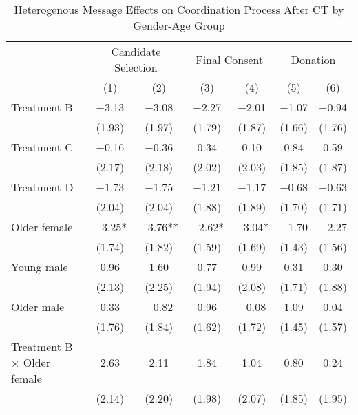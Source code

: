 \documentclass[12pt, a4paper]{article}
\begin{document}
\begin{table}[H]

\caption{\label{tab:lm-interaction-gender-age-coordinate}Heterogenous Message Effects on Coordination Process After CT by Gender-Age Group}
\centering
\fontsize{8}{10}\selectfont
\begin{threeparttable}
\begin{tabular}[t]{lcccccc}
\toprule
\multicolumn{1}{c}{ } & \multicolumn{2}{c}{Candidate Selection} & \multicolumn{2}{c}{Final Consent} & \multicolumn{2}{c}{Donation} \\
\cmidrule(l{3pt}r{3pt}){2-3} \cmidrule(l{3pt}r{3pt}){4-5} \cmidrule(l{3pt}r{3pt}){6-7}
  & (1) & (2) & (3) & (4) & (5) & (6)\\
\midrule
Treatment B & \num{-3.13} & \num{-3.08} & \num{-2.27} & \num{-2.01} & \num{-1.07} & \num{-0.94}\\
 & (\num{1.93}) & (\num{1.97}) & (\num{1.79}) & (\num{1.87}) & (\num{1.66}) & (\num{1.76})\\
Treatment C & \num{-0.16} & \num{-0.36} & \num{0.34} & \num{0.10} & \num{0.84} & \num{0.59}\\
 & (\num{2.17}) & (\num{2.18}) & (\num{2.02}) & (\num{2.03}) & (\num{1.85}) & (\num{1.87})\\
Treatment D & \num{-1.73} & \num{-1.75} & \num{-1.21} & \num{-1.17} & \num{-0.68} & \num{-0.63}\\
 & (\num{2.04}) & (\num{2.04}) & (\num{1.88}) & (\num{1.89}) & (\num{1.70}) & (\num{1.71})\\
Older female & \num{-3.25}* & \num{-3.76}** & \num{-2.62}* & \num{-3.04}* & \num{-1.70} & \num{-2.27}\\
 & (\num{1.74}) & (\num{1.82}) & (\num{1.59}) & (\num{1.69}) & (\num{1.43}) & (\num{1.56})\\
Young male & \num{0.96} & \num{1.60} & \num{0.77} & \num{0.99} & \num{0.31} & \num{0.30}\\
 & (\num{2.13}) & (\num{2.25}) & (\num{1.94}) & (\num{2.08}) & (\num{1.71}) & (\num{1.88})\\
Older male & \num{0.33} & \num{-0.82} & \num{0.96} & \num{-0.08} & \num{1.09} & \num{0.04}\\
 & (\num{1.76}) & (\num{1.84}) & (\num{1.62}) & (\num{1.72}) & (\num{1.45}) & (\num{1.57})\\
Treatment B $\times$ Older female & \num{2.63} & \num{2.11} & \num{1.84} & \num{1.04} & \num{0.80} & \num{0.24}\\
 & (\num{2.14}) & (\num{2.20}) & (\num{1.98}) & (\num{2.07}) & (\num{1.85}) & (\num{1.95})\\

\end{tabular}
\end{threeparttable}
\end{table}
\end{document}
